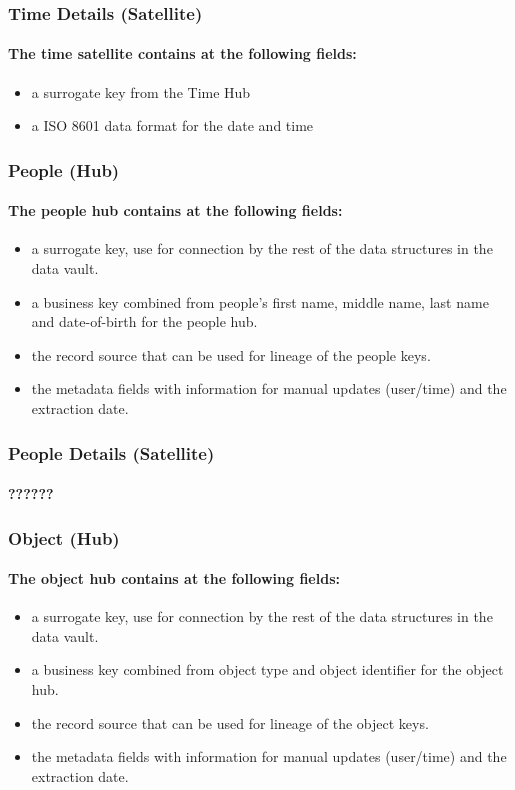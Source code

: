 \documentclass{acm_proc_article-sp}
\begin{document}
\subsubsection{Time Details (Satellite)}
\paragraph{The time satellite contains at the following fields:}
\begin{itemize}
\item{a surrogate key from the Time Hub}
\item{a ISO 8601 data format for the date and time}
\end{itemize}
\subsubsection{People (Hub)}
\paragraph{The people hub contains at the following fields:}
\begin{itemize}
  \item{a surrogate key, use for connection by the rest of the data structures in the data vault.}
  \item{a business key combined from people's first name, middle name, last name and date-of-birth for the people hub.}
  \item{the record source that can be used for lineage of the people keys.}
  \item{the metadata fields with information for manual updates (user/time) and the extraction date.}
\end{itemize}
\subsubsection{People Details (Satellite)}
\paragraph{??????}
\subsubsection{Object (Hub)}
\paragraph{The object hub contains at the following fields:}
\begin{itemize}
  \item{a surrogate key, use for connection by the rest of the data structures in the data vault.}
  \item{a business key combined from object type and object identifier for the object hub.}
  \item{the record source that can be used for lineage of the object keys.}
  \item{the metadata fields with information for manual updates (user/time) and the extraction date.}
\end{itemize}
\end{document}
